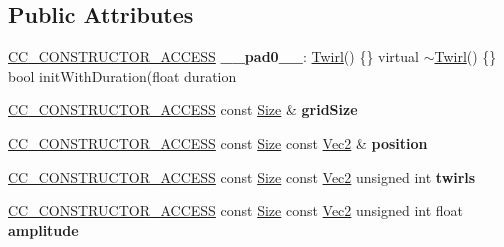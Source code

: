 \subsection*{Public Attributes}
\begin{DoxyCompactItemize}
\item 
\mbox{\label{classTwirl_a3ab13cf52d81a350ad63f8e81400460d}} 
\hyperlink{_2cocos2d_2cocos_2base_2ccConfig_8h_a25ef1314f97c35a2ed3d029b0ead6da0}{C\+C\+\_\+\+C\+O\+N\+S\+T\+R\+U\+C\+T\+O\+R\+\_\+\+A\+C\+C\+E\+SS} {\bfseries \+\_\+\+\_\+pad0\+\_\+\+\_\+}\+: \hyperlink{classTwirl}{Twirl}() \{\} virtual $\sim$\hyperlink{classTwirl}{Twirl}() \{\} bool init\+With\+Duration(float duration
\item 
\mbox{\label{classTwirl_a285d0e82e387ff432b7badb00337933c}} 
\hyperlink{_2cocos2d_2cocos_2base_2ccConfig_8h_a25ef1314f97c35a2ed3d029b0ead6da0}{C\+C\+\_\+\+C\+O\+N\+S\+T\+R\+U\+C\+T\+O\+R\+\_\+\+A\+C\+C\+E\+SS} const \hyperlink{classSize}{Size} \& {\bfseries grid\+Size}
\item 
\mbox{\label{classTwirl_ac7a45a2f3dbd2301ab1c74d438f7a386}} 
\hyperlink{_2cocos2d_2cocos_2base_2ccConfig_8h_a25ef1314f97c35a2ed3d029b0ead6da0}{C\+C\+\_\+\+C\+O\+N\+S\+T\+R\+U\+C\+T\+O\+R\+\_\+\+A\+C\+C\+E\+SS} const \hyperlink{classSize}{Size} const \hyperlink{classVec2}{Vec2} \& {\bfseries position}
\item 
\mbox{\label{classTwirl_aab5745ea2ddac0e42ab19821679e0cd9}} 
\hyperlink{_2cocos2d_2cocos_2base_2ccConfig_8h_a25ef1314f97c35a2ed3d029b0ead6da0}{C\+C\+\_\+\+C\+O\+N\+S\+T\+R\+U\+C\+T\+O\+R\+\_\+\+A\+C\+C\+E\+SS} const \hyperlink{classSize}{Size} const \hyperlink{classVec2}{Vec2} unsigned int {\bfseries twirls}
\item 
\mbox{\label{classTwirl_ae2de78da6a8dc4862d09c3f5fe888630}} 
\hyperlink{_2cocos2d_2cocos_2base_2ccConfig_8h_a25ef1314f97c35a2ed3d029b0ead6da0}{C\+C\+\_\+\+C\+O\+N\+S\+T\+R\+U\+C\+T\+O\+R\+\_\+\+A\+C\+C\+E\+SS} const \hyperlink{classSize}{Size} const \hyperlink{classVec2}{Vec2} unsigned int float {\bfseries amplitude}
\end{DoxyCompactItemize}
